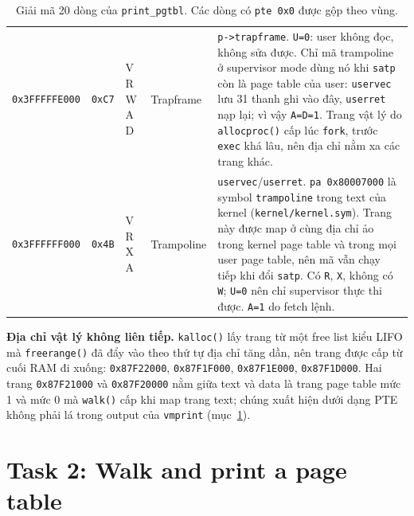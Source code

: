 \documentclass[10pt,a4paper]{article}
\newcommand{\cc}[1]{\texttt{#1}}
\begin{document}
\begin{table}[H]
\begin{tabularx}{\linewidth}{@{}>{\raggedright\arraybackslash}p{2.35cm} c >{\raggedright\arraybackslash}p{1.6cm} >{\raggedright\arraybackslash}p{2.3cm} >{\raggedright\arraybackslash}X@{}}
\rowcolor{rowalt}
\cc{0x3FFFFFE000} & \cc{0xC7} & V R W A D & Trapframe & \cc{p->trapframe}. \cc{U=0}: user không đọc, không sửa được. Chỉ mã trampoline ở supervisor mode dùng nó khi \cc{satp} còn là page table của user: \cc{uservec} lưu 31 thanh ghi vào đây, \cc{userret} nạp lại; vì vậy \cc{A=D=1}. Trang vật lý do \cc{allocproc()} cấp lúc \cc{fork}, trước \cc{exec} khá lâu, nên địa chỉ nằm xa các trang khác. \\
\cc{0x3FFFFFF000} & \cc{0x4B} & V R X A & Trampoline & \cc{uservec}/\cc{userret}. \cc{pa 0x80007000} là symbol \cc{trampoline} trong text của kernel (\cc{kernel/kernel.sym}). Trang này được map ở cùng địa chỉ ảo trong kernel page table và trong mọi user page table, nên mã vẫn chạy tiếp khi đổi \cc{satp}. Có \cc{R}, \cc{X}, không có \cc{W}; \cc{U=0} nên chỉ supervisor thực thi được. \cc{A=1} do fetch lệnh. \\
\bottomrule
\end{tabularx}
\caption{Giải mã 20 dòng của \cc{print\_pgtbl}. Các dòng có \cc{pte 0x0} được gộp theo vùng.}\label{tab:q1}
\end{table}

\textbf{Địa chỉ vật lý không liên tiếp.} \cc{kalloc()} lấy trang từ một free list kiểu LIFO mà \cc{freerange()} đã đẩy vào theo thứ tự địa chỉ tăng dần, nên trang được cấp từ cuối RAM đi xuống: \cc{0x87F22000}, \cc{0x87F1F000}, \cc{0x87F1E000}, \cc{0x87F1D000}. Hai trang \cc{0x87F21000} và \cc{0x87F20000} nằm giữa text và data là trang page table mức 1 và mức 0 mà \cc{walk()} cấp khi map trang text; chúng xuất hiện dưới dạng PTE không phải lá trong output của \cc{vmprint} (mục~\ref{sec:task2}).

\section{Task 2: Walk and print a page table}\label{sec:task2}
\end{document}
